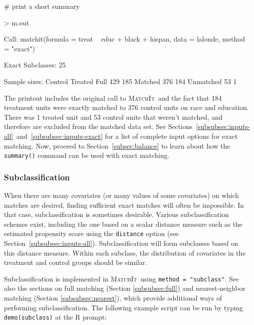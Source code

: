 \documentclass[oneside,letterpaper,titlepage]{article}
\newcommand{\MatchIt}{\textsc{MatchIt}}
\begin{document}
\noindent \# print a short summary
\begin{Schunk}
\begin{Sinput}
> m.out
\end{Sinput}
\begin{Soutput}
Call: matchit(formula = treat ~ educ + black + hispan, data = lalonde,     method = "exact")

Exact Subclasses: 25

Sample sizes:
          Control Treated
Full          429     185
Matched       376     184
Unmatched      53       1
\end{Soutput}
\end{Schunk}

The printout includes the original call to \MatchIt\ and the fact that
184
treatment units were exactly matched to 376 
control units on race
and education. There was 1
treated unit and 53
control units that weren't matched,
and therefore are excluded from the matched data set. See
Sections~\ref{subsubsec:inputs-all}~and~\ref{subsubsec:inputs-exact}
for a list of complete input options for exact matching.  Now, proceed
to Section~\ref{subsec:balance} to learn about how the {\tt summary()}
command can be used with exact matching.

\subsubsection{Subclassification}
\label{subsubsec:subclass}

When there are many covariates (or many values of some covariates) on
which matches are desired, finding sufficient exact matches will often
be impossible.  In that case, subclassification is sometimes
desirable. Various subclassification schemes exist, including the one
based on a scalar distance measure such as the estimated propensity
score using the \texttt{distance} option (see
Section~\ref{subsubsec:inputs-all}).  Subclassification will form
subclasses based on this distance measure.  Within each subclass, the
distribution of covariates in the treatment and control groups should
be similar.

Subclassification is implemented in \MatchIt\ using \texttt{method =
  "subclass"}.  See also the sections on full matching (Section
\ref{subsubsec:full}) and nearest-neighbor matching (Section
\ref{subsubsec:nearest}), which provide additional ways of performing
subclassification.  The following example script can be run by typing
{\tt demo(subclass)} at the R prompt:
\end{document}
